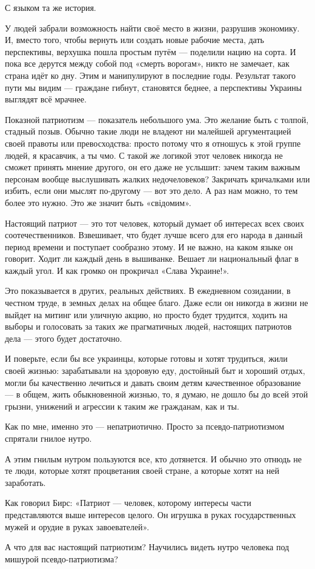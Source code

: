 С языком та же история. 

У людей забрали возможность найти своё место в жизни, разрушив экономику. И,
вместо того, чтобы вернуть или создать новые рабочие места, дать перспективы,
верхушка пошла простым путём --- поделили нацию на сорта. И пока все дерутся
между собой под «смерть ворогам», никто не замечает, как страна идёт ко дну.
Этим и манипулируют в последние годы. Результат такого пути мы видим --- граждане
гибнут, становятся беднее, а перспективы Украины выглядят всё мрачнее. 

Показной патриотизм --- показатель небольшого ума. Это желание быть с толпой,
стадный позыв. Обычно такие люди не владеют ни малейшей аргументацией своей
правоты или превосходства: просто потому что я отношусь к этой группе людей, я
красавчик, а ты чмо. С такой же логикой этот человек никогда не сможет принять
мнение другого, он его даже не услышит: зачем таким важным персонам вообще
выслушивать жалких недочеловеков? Закричать кричалками или избить, если они
мыслят по-другому --- вот это дело. А раз нам можно, то тем более это нужно. Это
же значит быть «свідомим». 

Настоящий патриот --- это тот человек, который думает об интересах всех своих
соотечественников. Взвешивает, что будет лучше всего для его народа в данный
период времени и поступает сообразно этому. И не важно, на каком языке он
говорит. Ходит ли каждый день в вышиванке. Вешает ли национальный флаг в каждый
угол. И как громко он прокричал «Слава Украине!». 


Это показывается в других, реальных действиях. В ежедневном созидании, в
честном труде, в земных делах на общее благо. Даже если он никогда в жизни не
выйдет на митинг или уличную акцию, но просто будет трудится, ходить на выборы
и голосовать за таких же прагматичных людей, настоящих патриотов дела --- этого
будет достаточно. 

И поверьте, если бы все украинцы, которые готовы и хотят трудиться, жили своей
жизнью: зарабатывали на здоровую еду, достойный быт и хороший отдых, могли бы
качественно лечиться и давать своим детям качественное образование --- в общем,
жить обыкновенной жизнью, то, я думаю, не дошло бы до всей этой грызни,
унижений и агрессии к таким же гражданам, как и ты.

Как по мне, именно это --- непатриотично.  Просто за псевдо-патриотизмом спрятали гнилое нутро.

А этим гнилым нутром пользуются все, кто дотянется. И обычно это отнюдь не те
люди, которые хотят процветания своей стране, а которые хотят на ней
заработать. 

Как говорил Бирс: «Патриот --- человек, которому интересы части представляются
выше интересов целого. Он игрушка в руках государственных мужей и орудие в
руках завоевателей».

А что для вас настоящий патриотизм? Научились видеть нутро человека под мишурой псевдо-патриотизма?

